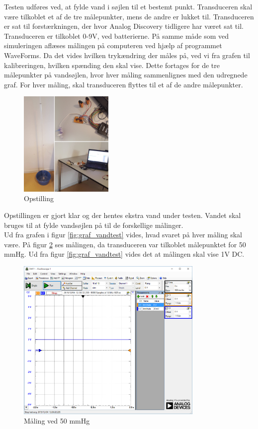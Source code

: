 Testen udføres ved, at fylde vand i søjlen til et bestemt punkt. Transduceren skal være tilkoblet et af de tre målepunkter, mens de andre er lukket til. Transduceren er sat til forstærkningen, der hvor Analog Discovery tidligere har været sat til. Transduceren er tilkoblet 0-9V, ved batterierne. På samme måde som ved simuleringen aflæses målingen på computeren ved hjælp af programmet WaveForms. Da det vides hvilken trykændring der måles på, ved vi fra grafen til kalibreringen, hvilken spænding den skal vise. Dette fortages for de tre målepunkter på vandsøjlen, hvor hver måling sammenlignes med den udregnede graf. For hver måling, skal transduceren flyttes til et af de andre målepunkter.  

\begin{figure}[H]
	\centering
	\includegraphics[width=0.4\textwidth]{Figurer/vandtest_opstilling}
	\caption{Opstilling}
	\label{fig:vandtest_opstilling}
\end{figure} 
Opstillingen er gjort klar og der hentes ekstra vand under testen. Vandet skal bruges til at fylde vandsøjlen på til de forskellige målinger. \\
Ud fra grafen i figur \ref{fig:graf_vandtest} vides, hvad svaret på hver måling skal være. På figur \ref{fig:vandtest_måling50} ses målingen, da transduceren var tilkoblet målepunktet for 50 mmHg. Ud fra figur \ref{fig:graf_vandtest} vides det at målingen skal vise 1V DC.  
\begin{figure}[H]
	\centering	\includegraphics[width=0.8\textwidth]{Figurer/50mmhg}
	\caption{Måling ved 50 mmHg}
	\label{fig:vandtest_måling50}
\end{figure}
 
